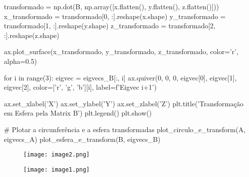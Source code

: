 {            transformado = np.dot(B, np.array([x.flatten(), y.flatten(), z.flatten()]))
            x_transformado = transformado[0, :].reshape(x.shape)
            y_transformado = transformado[1, :].reshape(y.shape)
            z_transformado = transformado[2, :].reshape(z.shape)
            
            ax.plot_surface(x_transformado, y_transformado, z_transformado, color='r', alpha=0.5)
            
            for i in range(3):
                eigvec = eigvecs_B[:, i]
                ax.quiver(0, 0, 0, eigvec[0], eigvec[1], eigvec[2], color=['r', 'g', 'b'][i], label=f'Eigvec {i+1}')
        
            ax.set_xlabel('X')
            ax.set_ylabel('Y')
            ax.set_zlabel('Z')
            plt.title('Transformação em Esfera pela Matrix B')
            plt.legend()
            plt.show()
        
        # Plotar a circunferência e a esfera transformadas
        plot_circulo_e_transform(A, eigvecs_A)
        plot_esfera_e_transform(B, eigvecs_B)
        }
        \begin{figure}
            \centering
            \texttt{[image: image2.png]}           
        \end{figure}
\begin{figure}
    \centering
    \texttt{[image: image1.png]}
\end{figure}
